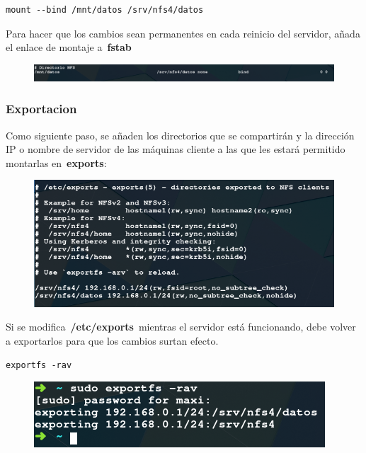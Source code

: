 \documentclass[12pt]{extarticle}
\makeatletter
\def\maxwidth{\ifdim\Gin@nat@width>\linewidth\linewidth
    \else\Gin@nat@width\fi}
\let\Oldincludegraphics\includegraphics
\renewcommand{\includegraphics}[1]{\Oldincludegraphics[width=.8\maxwidth]{#1}}
\makeatother
\begin{document}
\begin{verbatim}
mount --bind /mnt/datos /srv/nfs4/datos
\end{verbatim}

Para hacer que los cambios sean permanentes en cada reinicio del
servidor, añada el enlace de montaje a~\textbf{fstab}

\begin{figure}[h]
\centering
\includegraphics{images/fstab.png}
\caption{}
\end{figure}

\subsubsection{Exportacion}\label{exportacion}

Como siguiente paso, se añaden los directorios que se compartirán y la
dirección IP o nombre de servidor de las máquinas cliente a las que les
estará permitido montarlas en~\textbf{exports}:

\begin{figure}[h]
\centering
\includegraphics{images/exports.png}
\caption{}
\end{figure}

Si se modifica~\textbf{/etc/exports}~mientras el servidor está
funcionando, debe volver a exportarlos para que los cambios surtan
efecto.

\begin{verbatim}
exportfs -rav
\end{verbatim}

\begin{figure}[h]
\centering
\includegraphics{images/exportfs.png}
\caption{}
\end{figure}
\end{document}
